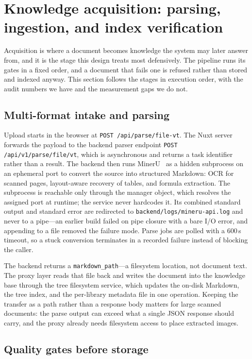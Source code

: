 \section{Knowledge acquisition: parsing, ingestion, and index verification}
\label{sec:acquisition}

Acquisition is where a document becomes knowledge the system may later
answer from, and it is the stage this design treats most defensively.
The pipeline runs its gates in a fixed order, and a document that fails
one is refused rather than stored and indexed anyway. This section
follows the stages in execution order, with the audit numbers we have
and the measurement gaps we do not.

\subsection{Multi-format intake and parsing}

Upload starts in the browser at \texttt{POST /api/parse/file-vt}. The
Nuxt server forwards the payload to the backend parser endpoint
\texttt{POST /api/v1/parse/file/vt}, which is asynchronous and returns a
task identifier rather than a result. The backend then runs
MinerU~\citep{mineru} as a hidden subprocess on an ephemeral port to
convert the source into structured Markdown: OCR for scanned pages,
layout-aware recovery of tables, and formula extraction. The subprocess
is reachable only through the manager object, which resolves the
assigned port at runtime; the service never hardcodes it. Its combined
standard output and standard error are redirected to
\texttt{backend/logs/mineru-api.log} and never to a pipe---an earlier
build failed on pipe closure with a bare I/O error, and appending to a
file removed the failure mode. Parse jobs are polled with a 600\,s
timeout, so a stuck conversion terminates in a recorded failure instead
of blocking the caller.

The backend returns a \texttt{markdown\_path}---a filesystem location,
not document text. The proxy layer reads that file back and writes the
document into the knowledge base through the tree filesystem service,
which updates the on-disk Markdown, the tree index, and the per-library
metadata file in one operation. Keeping the transfer as a path rather
than a response body matters for large scanned documents: the parse
output can exceed what a single JSON response should carry, and the
proxy already needs filesystem access to place extracted images.

\subsection{Quality gates before storage}

